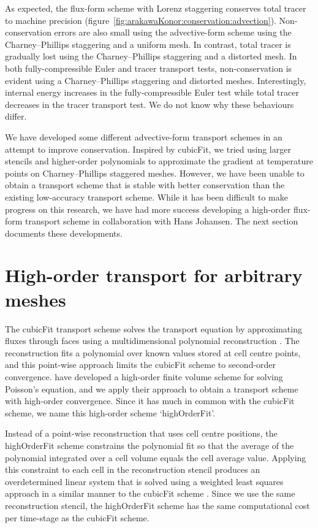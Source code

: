 \documentclass[a4paper,11pt]{article}
\begin{document}
As expected, the flux-form scheme with Lorenz staggering conserves total tracer to machine precision (figure~\ref{fig:arakawaKonor:conservation:advection}).  Non-conservation errors are also small using the advective-form scheme using the Charney--Phillips staggering and a uniform mesh.
In contrast, total tracer is gradually lost using the Charney--Phillips staggering and a distorted mesh.
In both fully-compressible Euler and tracer transport tests, non-conservation is evident using a Charney--Phillips staggering and distorted meshes.
Interestingly, internal energy increases in the fully-compressible Euler test while total tracer decreases in the tracer transport test.  We do not know why these behaviours differ.

We have developed some different advective-form transport schemes in an attempt to improve conservation.  Inspired by cubicFit, we tried using larger stencils and higher-order polynomials to approximate the gradient at temperature points on Charney--Phillips staggered meshes.  However, we have been unable to obtain a transport scheme that is stable with better conservation than the existing low-accuracy transport scheme.
While it has been difficult to make progress on this research, we have had more success developing a high-order flux-form transport scheme in collaboration with Hans Johansen.  The next section documents these developments.

\section{High-order transport for arbitrary meshes}

The cubicFit transport scheme solves the transport equation by approximating fluxes through faces using a multidimensional polynomial reconstruction \citep{shaw2017}.
The reconstruction fits a polynomial over known values stored at cell centre points, and this point-wise approach limits the cubicFit scheme to second-order convergence.
\citet{devendran2017} have developed a high-order finite volume scheme for solving Poisson's equation, and we apply their approach to obtain a transport scheme with high-order convergence.
Since it has much in common with the cubicFit scheme, we name this high-order scheme `highOrderFit'. 

Instead of a point-wise reconstruction that uses cell centre positions, the highOrderFit scheme constrains the polynomial fit so that the average of the polynomial integrated over a cell volume equals the cell average value.
Applying this constraint to each cell in the reconstruction stencil produces an overdetermined linear system that is solved using a weighted least squares approach in a similar manner to the cubicFit scheme \citep{shaw2017}.
Since we use the same reconstruction stencil, the highOrderFit scheme has the same computational cost per time-stage as the cubicFit scheme.
\end{document}
